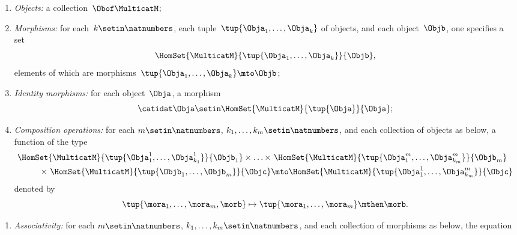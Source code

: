 {\begin{ctdefinition}[Multicategory]
    \constit
    \begin{enumerate}
        \item \emph{Objects:} a collection~$\Obof\MulticatM$;
        \item \emph{Morphisms:} for each~$k \setin \natnumbers$, each tuple~$\tup{\Obja_1,\ldots, \Obja_k}$ of objects, and each object~$ \Objb$, one specifies a set~
              \begin{equation}
                  \HomSet{\MulticatM}{\tup{\Obja_1,\ldots,\Obja_k}}{\Objb},
              \end{equation}
              elements of which are morphisms~$\tup{\Obja_1,\ldots,\Obja_k}\mto \Objb$;
        \item \emph{Identity morphisms:} for each object~$\Obja$, a morphism
              \begin{equation}
                  \catidat\Obja \setin \HomSet{\MulticatM}{\tup{\Obja}}{\Obja};
              \end{equation}
        \item \emph{Composition operations:} for each $m \setin \natnumbers$, $k_1, \dots, k_m \setin \natnumbers$, and each collection of objects as below, a function of the type
              \begin{equation}
                  \begin{aligned}
                      \HomSet{\MulticatM}{ \tup{\Obja_{1}^1, \ldots, \Obja_{k_1}^1} }{\Objb_1} \times \ldots \times & \ \HomSet{\MulticatM}{ \tup{\Obja_{1}^m, \ldots, \Obja_{k_m}^m} }{\Objb_m} \\
                      \qquad \times \ \HomSet{\MulticatM}{ \tup{\Objb_{1}, \ldots,\Objb_{m}} }{\Objc}               & \mto \HomSet{\MulticatM}{\tup{\Obja_{1}^1, \ldots, \Obja_{k_m}^m}}{\Objc}
                  \end{aligned}
              \end{equation}
              denoted by
              \begin{equation}
                  \tup{\mora_1,\ldots,\mora_m,\morb} \mapsto \tup{\mora_1,\ldots, \mora_m}\mthen \morb.
              \end{equation}
    \end{enumerate}
    \condit
    \begin{enumerate}
        \item \emph{Associativity:} for each $m \setin \natnumbers$, $k_1, \dots, k_m \setin \natnumbers$, and each collection of morphisms as below, the equation
              \begin{equation}

\end{equation}
\end{enumerate}
\end{ctdefinition}}
